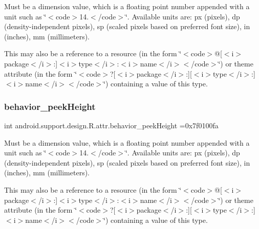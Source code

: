 Must be a dimension value, which is a floating point number appended with a unit such as \char`\"{}$<$code$>$14.\+5sp$<$/code$>$\char`\"{}. Available units are\+: px (pixels), dp (density-\/independent pixels), sp (scaled pixels based on preferred font size), in (inches), mm (millimeters). 

This may also be a reference to a resource (in the form \char`\"{}$<$code$>$@\mbox{[}$<$i$>$package$<$/i$>$\+:\mbox{]}$<$i$>$type$<$/i$>$\+:$<$i$>$name$<$/i$>$$<$/code$>$\char`\"{}) or theme attribute (in the form \char`\"{}$<$code$>$?\mbox{[}$<$i$>$package$<$/i$>$\+:\mbox{]}\mbox{[}$<$i$>$type$<$/i$>$\+:\mbox{]}$<$i$>$name$<$/i$>$$<$/code$>$\char`\"{}) containing a value of this type. \mbox{\label{classandroid_1_1support_1_1design_1_1R_1_1attr_ac53824c6ca9d593963ac006a84e4d4b3}} 
\subsubsection{\texorpdfstring{behavior\+\_\+peek\+Height}{behavior\_peekHeight}}
{\footnotesize\ttfamily int android.\+support.\+design.\+R.\+attr.\+behavior\+\_\+peek\+Height =0x7f0100fa\hspace{0.3cm}{\ttfamily [static]}}

Must be a dimension value, which is a floating point number appended with a unit such as \char`\"{}$<$code$>$14.\+5sp$<$/code$>$\char`\"{}. Available units are\+: px (pixels), dp (density-\/independent pixels), sp (scaled pixels based on preferred font size), in (inches), mm (millimeters). 

This may also be a reference to a resource (in the form \char`\"{}$<$code$>$@\mbox{[}$<$i$>$package$<$/i$>$\+:\mbox{]}$<$i$>$type$<$/i$>$\+:$<$i$>$name$<$/i$>$$<$/code$>$\char`\"{}) or theme attribute (in the form \char`\"{}$<$code$>$?\mbox{[}$<$i$>$package$<$/i$>$\+:\mbox{]}\mbox{[}$<$i$>$type$<$/i$>$\+:\mbox{]}$<$i$>$name$<$/i$>$$<$/code$>$\char`\"{}) containing a value of this type. \mbox{\label{classandroid_1_1support_1_1design_1_1R_1_1attr_ace596a46988f2ff961b6fb676b7ddf15}} 
